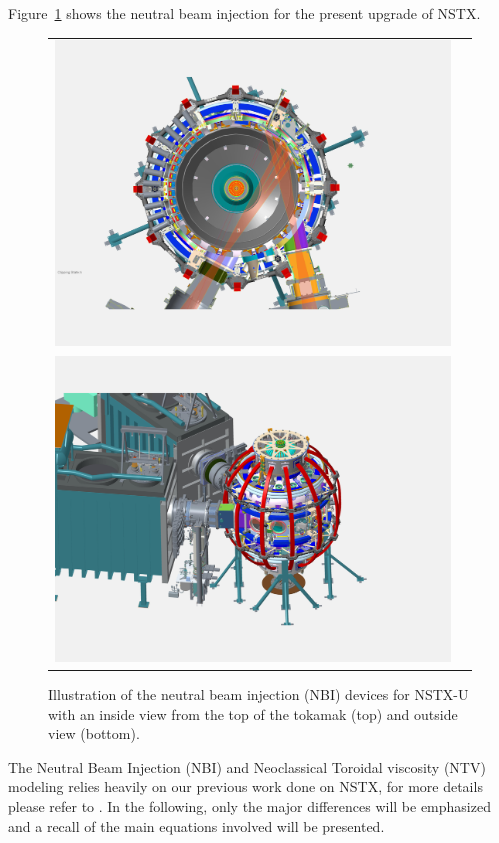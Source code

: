 \documentclass[12pt,lot, lof]{puthesis}
\begin{document}
Figure~{\ref{NBI_pics}} shows the neutral beam injection for the present upgrade of NSTX. 
\begin{figure}
\centering
\begin{tabular}{cc}
\includegraphics[width=0.6\linewidth]{chap10/fig3a} \\
\includegraphics[width=0.6\linewidth]{chap10/fig3b}
\end{tabular}
\caption{Illustration of the neutral beam injection (NBI) devices for NSTX-U with an inside view from the top of the tokamak (top) and outside view (bottom).}
\label{NBI_pics}
\end{figure}

The Neutral Beam Injection (NBI) and Neoclassical Toroidal viscosity (NTV) modeling relies heavily on our previous work done on NSTX, for more details please refer to \cite{Goumiri15}. In the following, only the major differences will be emphasized and a recall of the main equations involved will be presented.
\end{document}
